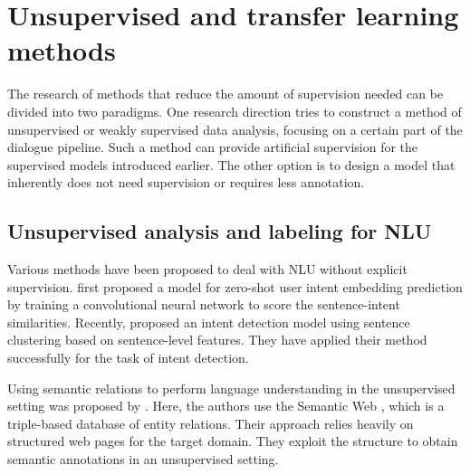 \section{Unsupervised and transfer learning methods}
\label{sec:relwork-unsup}
The research of methods that reduce the amount of supervision needed can be divided into two paradigms.
One research direction tries to construct a method of unsupervised or weakly supervised data analysis, focusing on a certain part of the dialogue pipeline.
Such a method can provide artificial supervision for the supervised models introduced earlier.
The other option is to design a model that inherently does not need supervision or requires less annotation.

\subsection{Unsupervised analysis and labeling for NLU}
Various methods have been proposed to deal with NLU without explicit supervision.
\citet{chen2016zero} first proposed a model for zero-shot user intent embedding prediction by training a convolutional neural network to score the sentence-intent similarities.
Recently, \citet{shi2018auto} proposed an intent detection model using sentence clustering based on sentence-level features.
They have applied their method successfully for the task of intent detection.

Using semantic relations to perform language understanding in the unsupervised setting was proposed by \citet{heck2012exploiting}.
Here, the authors use the Semantic Web \cite{berners2001semantic}, which is a triple-based database of entity relations.
Their approach relies heavily on structured web pages for the target domain.
They exploit the structure to obtain semantic annotations in an unsupervised setting.

